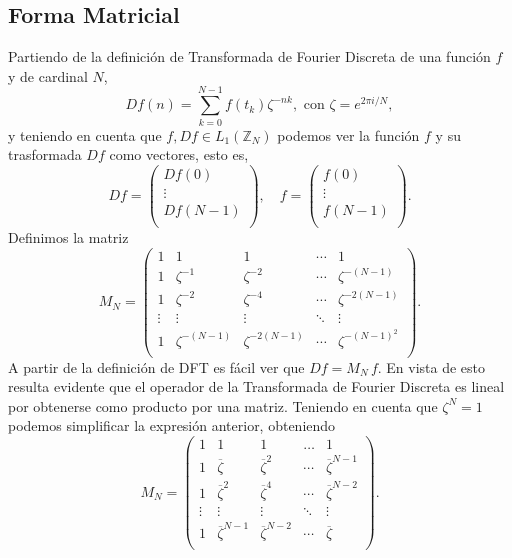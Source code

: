 \documentclass{article}
\begin{document}
\subsection{Forma Matricial}\label{sec:matrix}
Partiendo de la definición de Transformada de Fourier Discreta de una función $f$ y de cardinal $N$,
\[
Df(n)=\sum_{k=0}^{N-1}f(t_k) \zeta^{-nk}, \text{ con }  \zeta=e^{2\pi i/N},
\]
y teniendo en cuenta que $f,Df\in L_{1}(\mathbb{Z}_{N})$ podemos ver la función $f$ y su trasformada $Df$ como vectores, esto es,
\[
Df=\begin{pmatrix}
Df(0)\\ \vdots\\Df(N-1)\\
\end{pmatrix}
, \quad
f=\begin{pmatrix}
f(0)\\ \vdots\\f(N-1)\\
\end{pmatrix}.
\]
Definimos la matriz
\[
M_{N}=\begin{pmatrix}
1      &  1             & 1               & \cdots & 1 \\
1      & \zeta^{-1}     & \zeta^{-2}      & \cdots & \zeta^{-(N-1)} \\
1      & \zeta^{-2}     & \zeta^{-4}      & \cdots & \zeta^{-2(N-1)} \\
\vdots & \vdots         & \vdots          & \ddots & \vdots\\
1      & \zeta^{-(N-1)} & \zeta^{-2(N-1)} & \cdots & \zeta^{-(N-1)^2} \\
\end{pmatrix}.
\]
 A partir de la definición de DFT es fácil ver que $Df=M_{N}\,f$. En vista de esto resulta evidente que el operador de la Transformada de Fourier Discreta es lineal por obtenerse como producto por una matriz. Teniendo en cuenta que $\zeta^N = 1$ podemos simplificar la expresión anterior, obteniendo
\begin{equation} \label{eq:mn}
M_{N}=\begin{pmatrix}
1&1&1&\dots&1 \\
1&\overline{ \zeta}&\overline{ \zeta}^{2}&\cdots&\overline{ \zeta}^{N-1}\\
1&\overline{ \zeta}^{2}&\overline{ \zeta}^{4}&\cdots&\overline{ \zeta}^{N-2}\\
\vdots&\vdots&\vdots&\ddots&\vdots\\
1&\overline{ \zeta}^{N-1}&\overline{ \zeta}^{N-2}&\cdots&\overline{ \zeta}\\
\end{pmatrix}.
\end{equation}
\end{document}
